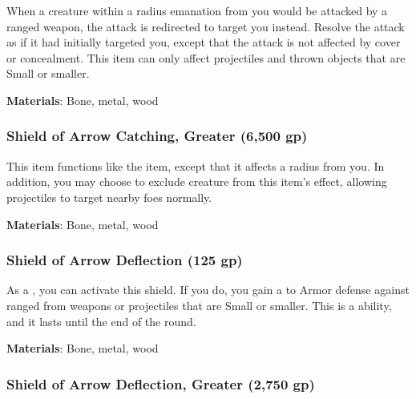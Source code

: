 When a creature within a \areamed radius emanation from you would be attacked by a ranged weapon, the attack is redirected to target you instead.
Resolve the attack as if it had initially targeted you, except that the attack is not affected by cover or concealment.
This item can only affect projectiles and thrown objects that are Small or smaller.



\vspace{0.25em}
\textbf{Materials}: Bone, metal, wood


\lowercase{\hypertarget{item:Shield of Arrow Catching, Greater}{}}\label{item:Shield of Arrow Catching, Greater}
\hypertarget{item:Shield of Arrow Catching, Greater}{\subsubsection{Shield of Arrow Catching, Greater\hfill{} (6,500 gp)}}

This item functions like the  item, except that it affects a \arealarge radius from you.
In addition, you may choose to exclude creature from this item's effect, allowing projectiles to target nearby foes normally.



\vspace{0.25em}
\textbf{Materials}: Bone, metal, wood


\lowercase{\hypertarget{item:Shield of Arrow Deflection}{}}\label{item:Shield of Arrow Deflection}
\hypertarget{item:Shield of Arrow Deflection}{\subsubsection{Shield of Arrow Deflection\hfill{} (125 gp)}}

As a , you can activate this shield.
If you do, you gain a   to Armor defense against ranged  from weapons or projectiles that are Small or smaller.
This is a  ability, and it lasts until the end of the round.



\vspace{0.25em}
\textbf{Materials}: Bone, metal, wood


\lowercase{\hypertarget{item:Shield of Arrow Deflection, Greater}{}}\label{item:Shield of Arrow Deflection, Greater}
\hypertarget{item:Shield of Arrow Deflection, Greater}{\subsubsection{Shield of Arrow Deflection, Greater\hfill{} (2,750 gp)}}

